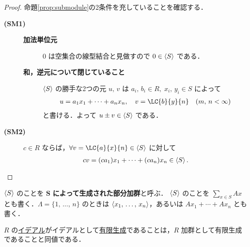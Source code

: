\documentclass[geometry_main]{subfiles}
\begin{document}
\begin{proof}
	命題\ref{prop:submodule}の2条件を充していることを確認する．
	\begin{description}
		\item[\textbf{(SM1)}] 
		\begin{description}
			\item[\textbf{加法単位元}] $0$ は空集合の線型結合と見做すので $0 \in \expval{S}$ である．
			\item[\textbf{和，逆元について閉じていること}] 
			$\expval{S}$ の勝手な2つの元 $u,\, v$ は $a_i,\, b_i \in R,\; x_i,\, y_i \in S$ によって
			\begin{align}
				u = a_1 x_1 + \cdots + a_n x_n,\quad v = \LC{b}{y}{n}\quad (m,\, n < \infty) 
			\end{align}
			と書ける．よって $u \pm v \in \expval{S}$ である． 
		\end{description}
		\item[\textbf{(SM2)}] $c \in R$ ならば，$\forall v = \LC{a}{x}{n} \in \expval{S}$ に対して
		\begin{align}
			cv = (ca_1) x_1 + \cdots + (ca_n) x_n \in \expval{S}.
		\end{align}
	\end{description}
\end{proof}

\begin{mydef}[]{}
	$\expval{S}$ のことを $\bm{S}$ \textbf{によって生成された部分加群}と呼ぶ．
	$\expval{S}$ のことを $\displaystyle\sum_{x \in S} Ax$ とも書く．$\Lambda = \{1,\, \dots ,\, n\}$ のときは $\expval{x_1,\, \dots ,\, x_n}$，あるいは $Ax_1 + \cdots +Ax_n$ とも書く．
\end{mydef}

\begin{marker}
	$R$ の\hyperref[def:ideal]{イデアル}がイデアルとして\hyperref[def:gen-ideal]{有限生成}であることは，$R$ 加群として有限生成であることと同値である．
\end{marker}
\end{document}
